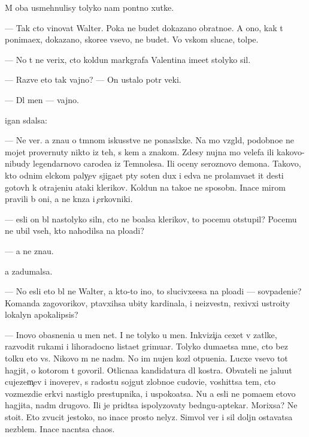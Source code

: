 \documentclass[10pt]{book}
\begin{document}
M{\yi} oba usmehnulisy tolyko nam pon{\ia}tno{\y} xutke.

— Tak cto vinovat Walter. Poka ne budet dokazano obratno{\y}e. A ono, kak t{\yi} ponima{\y}ex, dokazano, skore{\y}e vsevo, ne budet. Vo vs{\ia}kom sluca{\y}e, tolpe.

— No t{\yi} ne verix, cto koldun markgrafa Valentina ime{\y}et stolyko sil.

— Razve eto tak vajno? — On ustalo pot{\e}r veki.

— Dl{\ia} men{\ia} — vajno.

{\C}igan sdalsa:

— Ne ver{\io}. {\Y}a zna{\y}u o t{\e}mnom iskusstve ne ponasl{\yi}xke. Na mo{\y} vzgl{\ia}d, po\-dob\-no\-{\y}e ne mojet provernuty nikto iz teh, s kem {\y}a znakom. Zdesy nujna mo{\x} velefa ili kakovo-nibudy legendarnovo carode{\y}a iz Temnoles{\y}a. Ili oceny ser{\y}oznovo demona. Takovo, kto odnim {\x}elckom paly{\c}ev sjiga{\y}et p{\ia}ty soten dux i {\y}edva ne prolam{\yi}va{\y}et {\x}it des{\ia}ti gotov{\yi}h k otrajeni{\y}u ataki klerikov. Koldun{\yi} na tako{\y}e ne sposobn{\yi}. Inace mirom pravili b{\yi} oni, a ne kn{\ia}z{\y}a i {\c}erkovniki.

— {\Y}esli on b{\yi}l nastolyko sil{\e}n, cto ne bo{\y}alsa klerikov, to pocemu otstupil? Po\-ce\-mu ne ubil vseh, kto nahodilsa na plo{\x}adi?

— {\Y}a ne zna{\y}u.

{\Y}a zadumalsa.

— No {\y}esli eto b{\yi}l ne Walter, a kto-to ino{\y}, to slucivxe{\y}esa na plo{\x}adi — sovpadeni{\y}e? Komanda zagovor{\x}ikov, p{\yi}tavxihsa ubity kardinala, i neizvestn{\yi}{\y}, re\-xiv\-xi{\y} ustro{\y}ity lokalyn{\yi}{\y} apokalipsis?

— Inovo ob{\y}asneni{\y}a u men{\ia} net. I ne tolyko u men{\ia}. Inkvizi{\c}i{\y}a cexet v za\-t{\yi}l\-ke, razvodit rukami i lihoradocno lista{\y}et grimuar{\yi}. Tolyko duma{\y}etsa mne, cto bez tolku eto vs{\e}. Nikovo m{\yi} ne na{\y}d{\e}m. No im nujen koz{\e}l otpu{\x}eni{\y}a. Lucxe vsevo tot hagjit, o kotorom t{\yi} govoril. Otlicna{\y}a kandidatura dl{\ia} kostra. Ob{\yi}vateli ne jalu{\y}ut cujezem{\c}ev i inover{\c}ev, s radost{\y}u sojgut zlobno{\y}e cudovi{\x}e, voshit{\ia}tsa tem, cto vozmezdi{\y}e {\C}erkvi nastiglo prestupnika, i uspoko{\y}atsa. Nu a {\y}esli ne po{\y}ma{\y}em etovo hagjita, na{\y}d{\e}m drugovo. Ili je prid{\e}tsa ispolyzovaty bedn{\ia}gu-aptekar{\ia}. Mor\-{\x}ixsa? Ne stoit. Eto zvucit jestoko, no inace prosto nelyz{\ia}. Simvol{\yi} ver{\yi} i sil{\yi} doljn{\yi} ostavatsa nez{\yi}blem{\yi}. Inace nacn{\e}tsa chaos.
\end{document}

